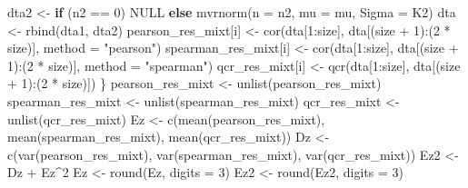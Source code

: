 \documentclass[
]{article}
\newenvironment{Shaded}{\begin{snugshade}}{\end{snugshade}}
\newcommand{\AttributeTok}[1]{\textcolor[rgb]{0.77,0.63,0.00}{#1}}
\newcommand{\ConstantTok}[1]{\textcolor[rgb]{0.00,0.00,0.00}{#1}}
\newcommand{\ControlFlowTok}[1]{\textcolor[rgb]{0.13,0.29,0.53}{\textbf{#1}}}
\newcommand{\DecValTok}[1]{\textcolor[rgb]{0.00,0.00,0.81}{#1}}
\newcommand{\FunctionTok}[1]{\textcolor[rgb]{0.00,0.00,0.00}{#1}}
\newcommand{\NormalTok}[1]{#1}
\newcommand{\OtherTok}[1]{\textcolor[rgb]{0.56,0.35,0.01}{#1}}
\newcommand{\SpecialCharTok}[1]{\textcolor[rgb]{0.00,0.00,0.00}{#1}}
\newcommand{\StringTok}[1]{\textcolor[rgb]{0.31,0.60,0.02}{#1}}
\begin{document}
\begin{Shaded}
\begin{Highlighting}[]
\NormalTok{        dta2 }\OtherTok{\textless{}{-}} \ControlFlowTok{if}\NormalTok{ (n2 }\SpecialCharTok{==} \DecValTok{0}\NormalTok{) }
            \ConstantTok{NULL} \ControlFlowTok{else} \FunctionTok{mvrnorm}\NormalTok{(}\AttributeTok{n =}\NormalTok{ n2, }\AttributeTok{mu =}\NormalTok{ mu, }\AttributeTok{Sigma =}\NormalTok{ K2)}
\NormalTok{        dta }\OtherTok{\textless{}{-}} \FunctionTok{rbind}\NormalTok{(dta1, dta2)}
\NormalTok{        pearson\_res\_mixt[i] }\OtherTok{\textless{}{-}} \FunctionTok{cor}\NormalTok{(dta[}\DecValTok{1}\SpecialCharTok{:}\NormalTok{size], dta[(size }\SpecialCharTok{+} \DecValTok{1}\NormalTok{)}\SpecialCharTok{:}\NormalTok{(}\DecValTok{2} \SpecialCharTok{*}\NormalTok{ size)], }\AttributeTok{method =} \StringTok{"pearson"}\NormalTok{)}
\NormalTok{        spearman\_res\_mixt[i] }\OtherTok{\textless{}{-}} \FunctionTok{cor}\NormalTok{(dta[}\DecValTok{1}\SpecialCharTok{:}\NormalTok{size], dta[(size }\SpecialCharTok{+} \DecValTok{1}\NormalTok{)}\SpecialCharTok{:}\NormalTok{(}\DecValTok{2} \SpecialCharTok{*}\NormalTok{ size)], }\AttributeTok{method =} \StringTok{"spearman"}\NormalTok{)}
\NormalTok{        qcr\_res\_mixt[i] }\OtherTok{\textless{}{-}} \FunctionTok{qcr}\NormalTok{(dta[}\DecValTok{1}\SpecialCharTok{:}\NormalTok{size], dta[(size }\SpecialCharTok{+} \DecValTok{1}\NormalTok{)}\SpecialCharTok{:}\NormalTok{(}\DecValTok{2} \SpecialCharTok{*}\NormalTok{ size)])}
\NormalTok{    \}}
\NormalTok{    pearson\_res\_mixt }\OtherTok{\textless{}{-}} \FunctionTok{unlist}\NormalTok{(pearson\_res\_mixt)}
\NormalTok{    spearman\_res\_mixt }\OtherTok{\textless{}{-}} \FunctionTok{unlist}\NormalTok{(spearman\_res\_mixt)}
\NormalTok{    qcr\_res\_mixt }\OtherTok{\textless{}{-}} \FunctionTok{unlist}\NormalTok{(qcr\_res\_mixt)}
\NormalTok{    Ez }\OtherTok{\textless{}{-}} \FunctionTok{c}\NormalTok{(}\FunctionTok{mean}\NormalTok{(pearson\_res\_mixt), }\FunctionTok{mean}\NormalTok{(spearman\_res\_mixt), }\FunctionTok{mean}\NormalTok{(qcr\_res\_mixt))}
\NormalTok{    Dz }\OtherTok{\textless{}{-}} \FunctionTok{c}\NormalTok{(}\FunctionTok{var}\NormalTok{(pearson\_res\_mixt), }\FunctionTok{var}\NormalTok{(spearman\_res\_mixt), }\FunctionTok{var}\NormalTok{(qcr\_res\_mixt))}
\NormalTok{    Ez2 }\OtherTok{\textless{}{-}}\NormalTok{ Dz }\SpecialCharTok{+}\NormalTok{ Ez}\SpecialCharTok{\^{}}\DecValTok{2}
\NormalTok{    Ez }\OtherTok{\textless{}{-}} \FunctionTok{round}\NormalTok{(Ez, }\AttributeTok{digits =} \DecValTok{3}\NormalTok{)}
\NormalTok{    Ez2 }\OtherTok{\textless{}{-}} \FunctionTok{round}\NormalTok{(Ez2, }\AttributeTok{digits =} \DecValTok{3}\NormalTok{)}

\end{Highlighting}
\end{Shaded}
\end{document}
